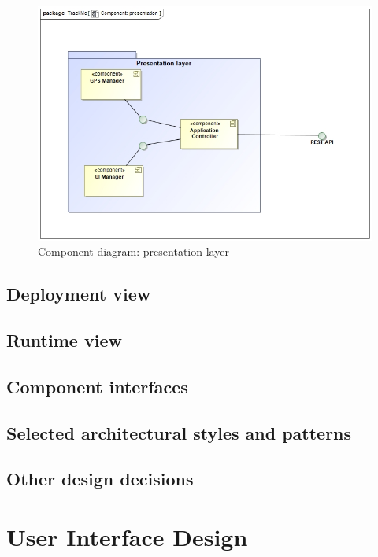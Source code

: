 \documentclass[a4paper]{article}
\begin{document}
 
    
    \begin{figure}[!htpb]
        \centering
        \includegraphics[width=\textwidth]{DD/images/CP.jpg}
        \caption{Component diagram: presentation layer}
    \end{figure}
    \newpage





\subsection{Deployment view}

\subsection{Runtime view}

\subsection{Component interfaces}

\subsection{Selected architectural styles and patterns}

\subsection{Other design decisions}
\newpage
\section{User Interface Design}
\end{document}

